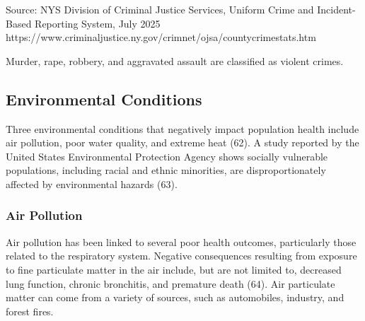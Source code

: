 \documentclass[
  english,
  letterpaper,
]{report}
\begin{document}
\begin{tcolorbox}[enhanced jigsaw, breakable, leftrule=.75mm, title=\textcolor{quarto-callout-note-color}{\faInfo}\hspace{0.5em}{Source}, bottomrule=.15mm, opacityback=0, left=2mm, colback=white, bottomtitle=1mm, coltitle=black, colbacktitle=quarto-callout-note-color!10!white, colframe=quarto-callout-note-color-frame, opacitybacktitle=0.6, toptitle=1mm, titlerule=0mm, arc=.35mm, rightrule=.15mm, toprule=.15mm]

Source: NYS Division of Criminal Justice Services, Uniform Crime and
Incident-Based Reporting System, July 2025
https://www.criminaljustice.ny.gov/crimnet/ojsa/countycrimestats.htm

\end{tcolorbox}

\begin{tcolorbox}[enhanced jigsaw, breakable, leftrule=.75mm, title=\textcolor{quarto-callout-note-color}{\faInfo}\hspace{0.5em}{Note}, bottomrule=.15mm, opacityback=0, left=2mm, colback=white, bottomtitle=1mm, coltitle=black, colbacktitle=quarto-callout-note-color!10!white, colframe=quarto-callout-note-color-frame, opacitybacktitle=0.6, toptitle=1mm, titlerule=0mm, arc=.35mm, rightrule=.15mm, toprule=.15mm]

Murder, rape, robbery, and aggravated assault are classified as violent
crimes.

\end{tcolorbox}

\subsection{Environmental Conditions}\label{environmental-conditions}

Three environmental conditions that negatively impact population health
include air pollution, poor water quality, and extreme heat (62). A
study reported by the United States Environmental Protection Agency
shows socially vulnerable populations, including racial and ethnic
minorities, are disproportionately affected by environmental hazards
(63).

\subsubsection{Air Pollution}\label{air-pollution}

Air pollution has been linked to several poor health outcomes,
particularly those related to the respiratory system. Negative
consequences resulting from exposure to fine particulate matter in the
air include, but are not limited to, decreased lung function, chronic
bronchitis, and premature death (64). Air particulate matter can come
from a variety of sources, such as automobiles, industry, and forest
fires.
\end{document}
